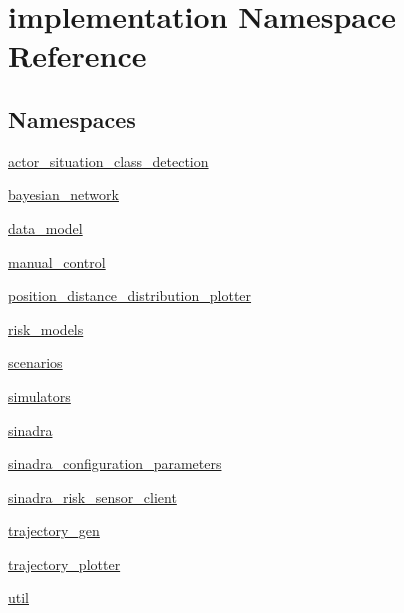 \hypertarget{namespaceimplementation}{}\section{implementation Namespace Reference}
\label{namespaceimplementation}
\subsection*{Namespaces}
\begin{DoxyCompactItemize}
\item 
 \hyperlink{namespaceimplementation_1_1actor__situation__class__detection}{actor\+\_\+situation\+\_\+class\+\_\+detection}
\item 
 \hyperlink{namespaceimplementation_1_1bayesian__network}{bayesian\+\_\+network}
\item 
 \hyperlink{namespaceimplementation_1_1data__model}{data\+\_\+model}
\item 
 \hyperlink{namespaceimplementation_1_1manual__control}{manual\+\_\+control}
\item 
 \hyperlink{namespaceimplementation_1_1position__distance__distribution__plotter}{position\+\_\+distance\+\_\+distribution\+\_\+plotter}
\item 
 \hyperlink{namespaceimplementation_1_1risk__models}{risk\+\_\+models}
\item 
 \hyperlink{namespaceimplementation_1_1scenarios}{scenarios}
\item 
 \hyperlink{namespaceimplementation_1_1simulators}{simulators}
\item 
 \hyperlink{namespaceimplementation_1_1sinadra}{sinadra}
\item 
 \hyperlink{namespaceimplementation_1_1sinadra__configuration__parameters}{sinadra\+\_\+configuration\+\_\+parameters}
\item 
 \hyperlink{namespaceimplementation_1_1sinadra__risk__sensor__client}{sinadra\+\_\+risk\+\_\+sensor\+\_\+client}
\item 
 \hyperlink{namespaceimplementation_1_1trajectory__gen}{trajectory\+\_\+gen}
\item 
 \hyperlink{namespaceimplementation_1_1trajectory__plotter}{trajectory\+\_\+plotter}
\item 
 \hyperlink{namespaceimplementation_1_1util}{util}
\end{DoxyCompactItemize}
